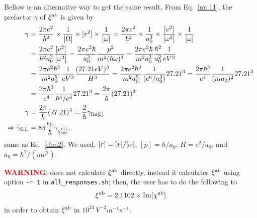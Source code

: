 \documentclass[12pt]{article}
\numberwithin{equation}{section}
\begin{document}
\begin{enumerate}
Bellow is an alternative way to get the same result.
From Eq.~\eqref{nn.11}, the prefactor $\gamma$ of $\xi^{\mathrm{a}\mathrm{b}}$ is given by 
\begin{align}\label{ne.4n}
\gamma 
&=
\frac{2\pi e^2}{\hbar^2}\times\frac{1}{[\Omega]}
\times [r^2] \times \frac{1}{[\omega]}
=
\frac{2\pi e^2}{\hbar^2}\times\frac{1}{a^3_0}
\times \frac{[v^2]}{[\omega^2]} 
\times \frac{1}{[\omega]}
\nonumber\\
&
=
\frac{2\pi  e^2}{\hbar^2 a^3_0}\frac{[v^2]}{[\omega^3]} 
=
\frac{2\pi  e^2\hbar}{a^3_0}\frac{p^2}{m^2(\hbar\omega)^3} 
=
\frac{2\pi  e^2\hbar}{m^2a^3_0}\frac{\hbar^2}{a^2_0}\frac{1}{eV^3} 
\nonumber\\
&
=
\frac{2\pi  e^2\hbar^3}{m^2a^5_0}\frac{1}{eV^3} 
\frac{(27.21eV)^3}{H^3}
=
\frac{2\pi  e^2\hbar^3}{m^2a^5_0}
\frac{1}{(e^6/a^3_0)}27.21^3 
=
\frac{2\pi  \hbar^3}{e^4}
\frac{1}{(ma_0)^2}27.21^3 
\nonumber\\
&=
\frac{2\pi  \hbar^3}{e^4}
\frac{1}{\hbar^4/e^4}27.21^3 
=
\frac{2\pi}{\hbar} 
 (27.21)^3 
\nonumber\\
\gamma 
&=\frac{2\pi}{\hbar} 
(27.21)^3= \frac{2}{\hbar}\gamma_{\mathrm{Im}[\xi]} 
\nonumber\\
\Rightarrow\gamma_{\mathrm{S.I.}}
&=8\pi\frac{\epsilon_0}{\hbar} \gamma_{\chi^{(1)}_{\mathrm{cgs}}} 
,
\end{align}
same as Eq.~\eqref{dim2}.
We used, 
$[r]=[v]/[\omega]$, $[p]=\hbar/a_0$, $H=e^2/a_0$, and 
$a_0=\hbar^2/(me^2)$. 

\textcolor{red}{\bf WARNING}: \tiniba does not calculate 
$\xi^{\mathrm{a}\mathrm{b}}$  
directly, instead it calculates $\xi^{\mathrm{a}\mathrm{b}}$ using option 
\verb=-r 1= in 
\verb=all_responses.sh=; then, the user has to do the following to 
\begin{align}\label{f.1}
\xi^{\mathrm{a}\mathrm{b}}=2.1102\times\mathrm{Im}[\chi^{\mathrm{a}\mathrm{b}}] 
\end{align}
in order to 
obtain $\xi^{\mathrm{a}\mathrm{b}}$ in $10^{24}\, V^{-2}m^{-1}s^{-1}$. 
 

\end{enumerate}
\end{document}
